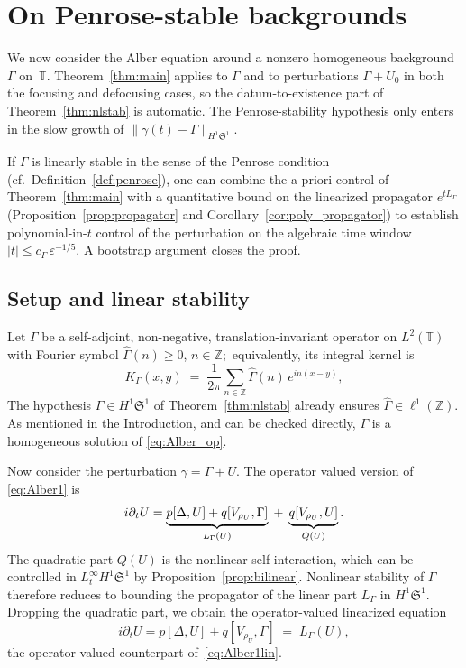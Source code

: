 \documentclass[11pt]{amsart}
\theoremstyle{definition}
\newcommand{\T}{\mathbb{T}}
\newcommand{\Z}{\mathbb{Z}}
\newcommand{\Sp}{\mathfrak{S}}
\begin{document}
\medskip

\section{On Penrose-stable backgrounds}\label{sec:stab}

We now consider the Alber equation around a nonzero homogeneous background $\Gamma$ on~$\T$. Theorem~\ref{thm:main} applies to $\Gamma$ and to perturbations $\Gamma+U_0$ in both the focusing and defocusing cases, so the datum-to-existence part of Theorem~\ref{thm:nlstab} is automatic. The Penrose-stability hypothesis only enters in the slow growth of $\|\gamma(t)-\Gamma\|_{H^1\Sp^1}.$

If $\Gamma$ is linearly stable in the sense of the Penrose condition (cf.\ Definition~\ref{def:penrose}), one can combine the a priori control of Theorem~\ref{thm:main} with a quantitative bound on the linearized propagator $e^{tL_\Gamma}$ (Proposition~\ref{prop:propagator} and Corollary~\ref{cor:poly_propagator}) to establish polynomial-in-$t$ control of the perturbation on the algebraic time window $|t|\le c_\Gamma\,\varepsilon^{-1/5}.$ A bootstrap argument closes the proof.

\subsection{Setup and linear stability}\label{subsec:setup_linstab}

Let $\Gamma$ be a self-adjoint, non-negative, translation-invariant operator on $L^2(\T)$ with Fourier symbol $\hat\Gamma(n)\ge 0$, $n\in\Z;$
equivalently, its integral kernel is
\begin{equation}
\label{eq:def_GammaFC}
	K_\Gamma(x,y) \;=\; \frac{1}{2\pi}\sum_{n\in\Z}\hat\Gamma(n)\,e^{in(x-y)},
\end{equation}
 The hypothesis $\Gamma\in H^1\Sp^1$ of Theorem~\ref{thm:nlstab} already ensures $\hat\Gamma\in\ell^1(\Z)$.
As mentioned in the Introduction, and can be checked directly, $\Gamma$ is a homogeneous solution of \eqref{eq:Alber_op}.

Now consider the perturbation $\gamma=\Gamma+U.$ The operator valued version of \eqref{eq:Alber1} is
\begin{equation}\label{eq:stab}
  i\partial_t U
  = \underbrace{p[\Delta,U]
  + q[V_{\rho_U},\Gamma]
  \vphantom{\big|}}_{L_\Gamma(U)}
  \;+\;
  \underbrace{q[V_{\rho_U},U]
  \vphantom{\big|}}_{Q(U)}.
\end{equation}
The quadratic part $Q(U)$ is the  nonlinear self-interaction, which can be controlled in $L^\infty_tH^1\Sp^1$ by Proposition~\ref{prop:bilinear}. Nonlinear stability of $\Gamma$ therefore reduces to bounding the propagator of the linear part $L_\Gamma$ in $H^1\Sp^1$. Dropping the quadratic part, we obtain the operator-valued linearized equation
\begin{equation}\label{eq:stab_lin}
  i\partial_t U
  = p[\Delta,U]
  + q[V_{\rho_U},\Gamma]
  \;=\; L_\Gamma(U),
\end{equation}
the operator-valued counterpart of~\eqref{eq:Alber1lin}.
\end{document}
